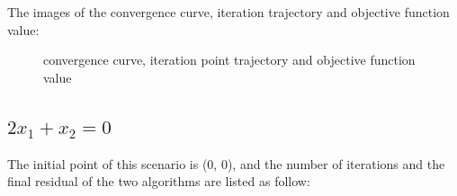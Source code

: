 \documentclass[12pt]{article}
\begin{document}
The images of the convergence curve, iteration trajectory and objective function value:\\
\begin{figure}[ht]
\centering
{}
\caption[]{convergence curve, iteration point trajectory and objective function value}
\label{fig:s1}
\end{figure}

\subsection{$2x_1 + x_2 = 0 $}

The initial point of this scenario is (0, 0), and the number of iterations and the final residual of the two algorithms are listed as follow:\\
\begin{table}[h]
    \centering
    \caption{s4}
    \label{tab:s2}
\end{table}
\end{document}
